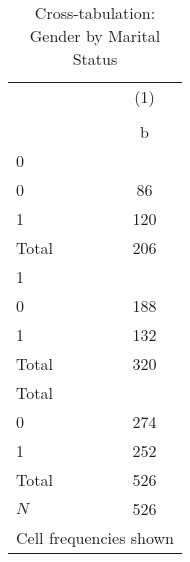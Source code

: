 \begin{table}[htbp]\centering
\def\sym#1{\ifmmode^{#1}\else\(^{#1}\)\fi}
\caption{Cross-tabulation: Gender by Marital Status}
\begin{tabular}{l*{1}{c}}
\toprule
            &\multicolumn{1}{c}{(1)}\\
            &\multicolumn{1}{c}{}\\
            &           b\\
\midrule
0           &            \\
0           &          86\\
1           &         120\\
Total       &         206\\
\midrule
1           &            \\
0           &         188\\
1           &         132\\
Total       &         320\\
\midrule
Total       &            \\
0           &         274\\
1           &         252\\
Total       &         526\\
\midrule
\(N\)       &         526\\
\bottomrule
\multicolumn{2}{l}{\footnotesize Cell frequencies shown}\\
\end{tabular}
\end{table}
